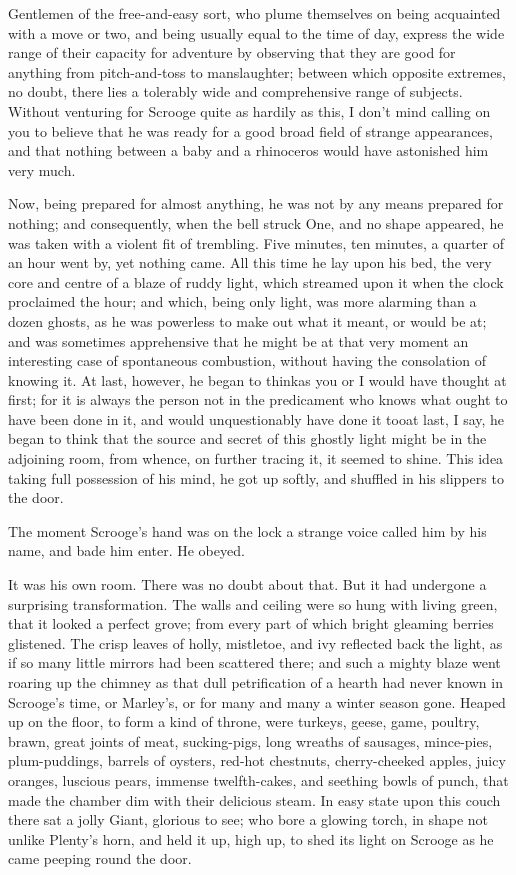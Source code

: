 \documentclass[paper=5.5in:8.5in,BCOR=7mm,twoside,DIV=calc,12pt,usegeometry]{scrbook} %
\begin{document}
Gentlemen of the free-and-easy sort, who plume themselves on being acquainted with a move or two, and being usually equal to the time of day, express the wide range of their capacity for adventure by observing that they are good for anything from pitch-and-toss to manslaughter; between which opposite extremes, no doubt, there lies a tolerably wide and comprehensive range of subjects. Without venturing for Scrooge quite as hardily as this, I don't mind calling on you to believe that he was ready for a good broad field of strange appearances, and that nothing between a baby and a rhinoceros would have astonished him very much.

Now, being prepared for almost anything, he was not by any means prepared for nothing; and consequently, when the bell \newline struck One, and no shape appeared, he was taken with a violent fit of trembling. Five minutes, ten minutes, a quarter of an hour went by, yet nothing came. All this time he lay upon his bed, the very core and centre of a blaze of ruddy light, which streamed upon it when the clock proclaimed the hour; and which, being only light, was more alarming than a dozen ghosts, as he was powerless to make out what it meant, or would be at; and was sometimes apprehensive that he might be at that very moment an interesting case of spontaneous combustion, without having the consolation of knowing it. At last, however, he began to think\textemdash as you or I would have thought at first; for it is always the person not in the predicament who knows what ought to have been done in it, and would unquestionably have done it too\textemdash at last, I say, he began to think that the source and secret of this ghostly light might be in the adjoining room, from whence, on further tracing it, it seemed to shine. This idea taking full possession of his mind, he got up softly, and shuffled in his slippers to the door.

The moment Scrooge's hand was on the lock a strange voice called him by his name, and bade him enter. He obeyed.

It was his own room. There was no doubt about that. But it had undergone a surprising transformation. The walls and ceiling were so hung with living green, that it looked a perfect grove; from every part of which bright gleaming berries glistened. The crisp leaves of holly, mistletoe, and ivy reflected back the light, as if so many little mirrors had been scattered there; and such a mighty blaze went roaring up the chimney as that dull petrification of a hearth had never known in Scrooge's time, or Marley's, or for many and many a winter season gone. Heaped up on the floor, to form a kind of throne, were turkeys, geese, game, poultry, brawn, great joints of meat, sucking-pigs, long wreaths of sausages, mince-pies, plum-puddings, barrels of oysters, red-hot chestnuts, cherry-cheeked apples, juicy oranges, luscious pears, immense twelfth-cakes, and seething bowls of punch, that made the chamber dim with their delicious steam. In easy state upon this couch there sat a jolly Giant, glorious to see; who bore a glowing torch, in shape not unlike Plenty's horn, and held it up, high up, to shed its light on Scrooge as he came peeping round the door.
\end{document}
